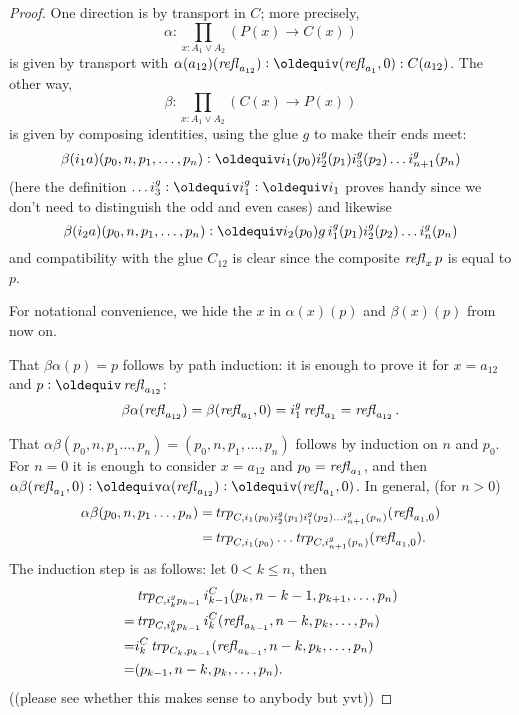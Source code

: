 \begin{proof}
One direction is by transport in $C$; more precisely, 
$$\alpha:\prod_{x:A_1\vee A_2}(P(x)\to C(x))$$ is given by transport with $\alpha(a_{12})(\refl{a_{12}})\defequi(\refl{a_{1}},0):C(a_{12})$.  %
The other way, 
$$\beta:\prod_{x:A_1\vee A_2}(C(x)\to P(x))$$ is given by composing identities, using the glue $g$ to make their ends meet: 
$$\beta(i_1a)(p_0,n,p_1,\dots,p_n)\defequi i_1(p_0)i_2^g(p_1)i_3^g(p_2) \dots i_{n+1}^g(p_n)$$ 
(here the definition $\dots i_3^g\defequi i_1^g\defequi i_1$ proves handy since we don't need to distinguish the odd and even cases)  %
and likewise 
$$\beta(i_2a)(p_0,n,p_1,\dots,p_n)\defequi i_2(p_0)g\,i_1^g(p_1)i_2^g(p_2) \dots i_{n}^g(p_n)$$ and compatibility with the glue $C_{12}$ is clear since the composite $\mathop{{\it refl}_{x}}p$ is equal to $p$.

For notational convenience, we hide the $x$ in $\alpha(x)(p)$ and $\beta(x)(p)$ from now on.

That $\beta\alpha(p)=p$ follows by path induction: it is enough to prove it for $x=a_{12}$ and
$p\defequi\refl{a_{12}}$:
$$\beta\alpha(\mathop{{\it refl}_{a_{12}}})=\beta(\mathop{{\it refl}_{a_1}},0)=i_1^g\mathop{{\it refl}_{a_1}}=\mathop{{\it refl}_{a_{12}}}.$$  

That $\alpha\beta(p_0,n,p_1\dots,p_n)=(p_0,n,p_1,\dots,p_n)$ follows by induction on $n$ and $p_0$.  For $n=0$ it is enough to consider  $x=a_{12}$ and $p_0=\mathop{{\it refl}_{a_1}}$, and then 
$\alpha\beta(\refl{a_1},0)\defequi\alpha(\refl{a_{12}})\defequi(\refl{a_1},0)$.  In general, (for $n>0$) 
\begin{align*}
  \alpha\beta(p_0,n,p_1\dots,p_n)
=&\mathop{\mathit{trp}_{C,i_1(p_0)i_2^g(p_1)i_1^g(p_2) \dots i_{n+1}^g(p_n)}}(\mathop{{\it refl}_{a_1,0}})\\
=&\mathop{\mathit{trp}_{C,i_1(p_0)}}\dots\mathop{\mathit{trp}_{C,i_{n+1}^g(p_n)}}(\mathop{{\it refl}_{a_1,0}}).
\end{align*}
  The induction step is as follows: let $0< k\leq n$, then 
\begin{align*}
  &\mathop{\mathit{trp}_{C,i_k^gp_{k-1}}}i^C_{k-1}(p_k,n-k-1,p_{k+1},\dots,p_n)\\
  =&\mathop{\mathit{trp}_{C,i_k^gp_{k-1}}}i^C_k(\mathop{{\it refl}_{a_{k-1}}},n-k,p_k,\dots,p_n)\\
  =&i^C_k\mathop{\mathit{trp}_{C_k,p_{k-1}}}(\mathop{{\it refl}_{a_{k-1}}},n-k,p_k,\dots,p_n)\\
  =&(p_{k-1},n-k,p_k,\dots,p_n).
\end{align*}
((please see whether this makes sense to anybody but yvt))
\end{proof}

